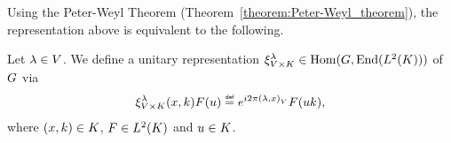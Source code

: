 Using the Peter-Weyl Theorem (Theorem~\ref{theorem:Peter-Weyl_theorem}),
the representation above is equivalent to the following.

\begin{definition}
    Let $\lambda \in \VectorSpace$.
    We define a unitary representation $\Rep [\GroupDirect] {\lambda} \in \Hom(\Group, \End(\Lebesgue{2}{\CompactGroup}))$ of $\Group$ via
    \begin{align*}
        \Rep [\GroupDirect] {\lambda} (x, k) F(u) \defeq \e^{\i \turn \ip \lambda x} F(u k),
    \end{align*}
    where $(x, k) \in \CompactGroup$, $F \in \Lebesgue{2}{\CompactGroup}$ and $u \in \CompactGroup$.
\end{definition}

%
%
%
%
